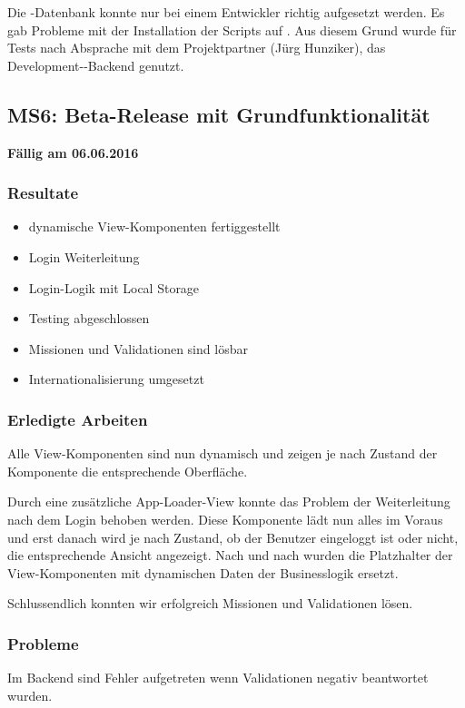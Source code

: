 Die \kort{}-Datenbank konnte nur bei einem Entwickler richtig aufgesetzt werden. 
Es gab Probleme mit der Installation der Scripts auf .
Aus diesem Grund wurde für Tests nach Absprache mit dem Projektpartner (Jürg Hunziker), das Development-\kort{}-Backend genutzt.

\subsection{MS6: Beta-Release mit Grundfunktionalität}
\label{pm-ms6}
\textbf{Fällig am 06.06.2016}
\subsubsection{Resultate}
\begin{itemize}
	\item dynamische View-Komponenten fertiggestellt
	\item Login Weiterleitung
	\item Login-Logik mit Local Storage
	\item Testing abgeschlossen
	\item Missionen und Validationen sind lösbar
	\item Internationalisierung umgesetzt
\end{itemize}

\subsubsection{Erledigte Arbeiten}
Alle View-Komponenten sind nun dynamisch und zeigen je nach Zustand der Komponente die entsprechende Oberfläche.

Durch eine zusätzliche App-Loader-View konnte das Problem der Weiterleitung nach dem Login behoben werden.
Diese Komponente lädt nun alles im Voraus und erst danach wird je nach Zustand, ob der Benutzer eingeloggt ist oder nicht, die entsprechende Ansicht angezeigt.
Nach und nach wurden die Platzhalter der View-Komponenten mit dynamischen Daten der Businesslogik ersetzt.

Schlussendlich konnten wir erfolgreich Missionen und Validationen lösen.


\subsubsection{Probleme}
Im \gls{Backend} sind Fehler aufgetreten wenn Validationen negativ beantwortet wurden. 



